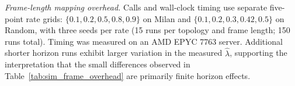 \emph{Frame-length mapping overhead.} Calls and wall-clock timing use separate five-point rate grids: \(\{0.1,0.2,0.5,0.8,0.9\}\) on Milan and \(\{0.1,0.2,0.3,0.42,0.5\}\) on Random, with three seeds per rate (15 runs per topology and frame length; 150 runs total). Timing was measured on an AMD EPYC 7763 server. Additional shorter horizon runs exhibit larger variation in the measured \(\hat\lambda\), supporting the interpretation that the small differences observed in Table~\ref{tab:sim_frame_overhead} are primarily finite horizon effects.
